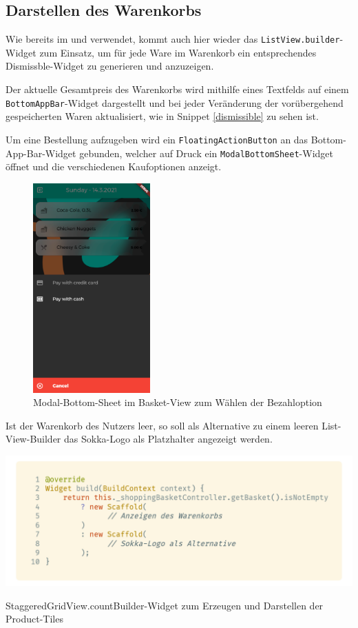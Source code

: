 \subsection{Darstellen des Warenkorbs}

Wie bereits im  und  verwendet, kommt auch hier wieder
das \lstinline{ListView.builder}-Widget zum Einsatz, um für jede Ware im Warenkorb ein 
entsprechendes Dismissble-Widget zu generieren und anzuzeigen.

Der aktuelle Gesamtpreis des Warenkorbs wird mithilfe eines Textfelds auf einem
\lstinline{BottomAppBar}-Widget dargestellt und bei jeder Veränderung der vorübergehend 
gespeicherten Waren aktualisiert, wie in Snippet \ref{dismissible} zu sehen ist.

Um eine Bestellung aufzugeben wird ein \lstinline{FloatingActionButton} an das Bottom-App-Bar-Widget
gebunden, welcher auf Druck ein \lstinline{ModalBottomSheet}-Widget öffnet und die verschiedenen
Kaufoptionen anzeigt.

\begin{figure}[H]
    \centering
    \includegraphics[width=0.40\textwidth]{images/Client/views/basketview/modalSheet.png}
    \caption{Modal-Bottom-Sheet im Basket-View zum Wählen der Bezahloption}
\end{figure}

Ist der Warenkorb des Nutzers leer, so soll als Alternative zu einem leeren List-View-Builder
das Sokka-Logo als Platzhalter angezeigt werden.

\begin{code}[H]
    \centering
    \includegraphics[width=1\textwidth]{images/Client/views/basketview/ternary.png}
    \vspace{-20pt}
    \caption{StaggeredGridView.countBuilder-Widget zum Erzeugen und Darstellen der Product-Tiles}
\end{code}

